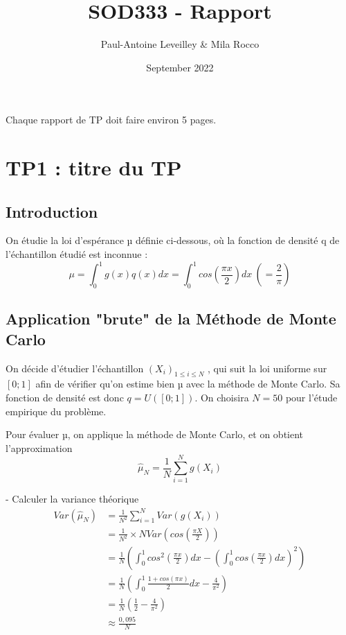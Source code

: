 \documentclass{article}
\title{SOD333 - Rapport}
\author{Paul-Antoine Leveilley \& Mila Rocco}
\date{September 2022}
\begin{document}
\maketitle

\begin{center}
Chaque rapport de TP doit faire environ 5 pages.
\end{center}







\newpage
\section{TP1 : titre du TP}

\subsection{Introduction}
On étudie la loi d'espérance µ définie ci-dessous, où la fonction de densité q de l'échantillon étudié est inconnue :
$$\mu = \int_0^1 g(x)q(x)dx = \int_0^1 cos(\frac{\pi x}{2})dx\ (=\frac{2}{\pi})$$

 \subsection{Application "brute" de la Méthode de Monte Carlo}
On décide d'étudier l'échantillon $(X_i)_{1\leq i \leq N}$ , qui suit la loi uniforme sur $[0;1]$ afin de vérifier qu'on estime bien µ avec la méthode de Monte Carlo. Sa fonction de densité est donc $q=U([0;1])$. On choisira $N=50$ pour l'étude empirique du problème.

Pour évaluer µ, on applique la méthode de Monte Carlo, et on obtient l'approximation 
$$\hat{\mu}_N = \frac{1}{N} \sum_{i=1}^N g(X_i)$$

- Calculer la variance théorique\\
\begin{align*} 
  Var(\hat{\mu}_N) &= \frac1{N^2} \sum_{i=1}^N Var(g(X_i))\\ 
  &= \frac1{N^2}\times N Var(cos(\frac{\pi X}2)) \\ 
  &= \frac1{N} \left ( \int_0^1 cos^2(\frac{\pi x}2)dx - \left ( \int_0^1 cos(\frac{\pi x}2)dx \right )^2 \right )\\
  &= \frac1{N} \left ( \int_0^1 \frac{1+cos(\pi x)}{2}dx - 
   \frac4{\pi^2} \right )\\
  &= \frac1{N} \left ( \frac{1}{2} - 
   \frac4{\pi^2} \right )\\
  &\approx \frac{0,095}{N}
\end{align*}
\end{document}
